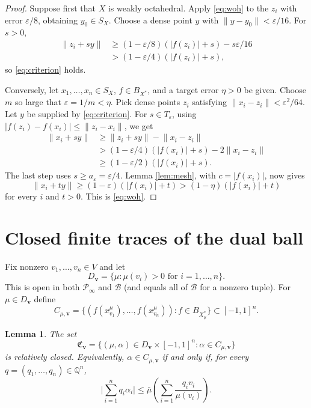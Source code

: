 \documentclass[11pt]{article}
\newtheorem{lemma}[theorem]{Lemma}
\newcommand{\norm}[1]{\lVert#1\rVert}
\newcommand{\abs}[1]{\lvert#1\rvert}
\newcommand{\Bcal}{\mathcal B}
\newcommand{\Pinf}{\mathcal P_\infty}
\begin{document}
\begin{proof}
Suppose first that $X$ is weakly octahedral.  Apply \eqref{eq:woh} to the
$z_i$ with error $\varepsilon/8$, obtaining $y_0\in S_X$.  Choose a dense
point $y$ with $\norm{y-y_0}<\varepsilon/16$.  For $s>0$,
\begin{align*}
 \norm{z_i+s y}
 &\geq (1-\varepsilon/8)(\abs{f(z_i)}+s)
       -s\varepsilon/16\\
 &>(1-\varepsilon/4)(\abs{f(z_i)}+s),
\end{align*}
so \eqref{eq:criterion} holds.

Conversely, let $x_1,\ldots,x_n\in S_X$, $f\in B_{X^*}$, and a target
error $\eta>0$ be given.  Choose $m$ so large that
$\varepsilon=1/m<\eta$.  Pick dense points $z_i$ satisfying
$\norm{x_i-z_i}<\varepsilon^2/64$.  Let $y$ be supplied by
\eqref{eq:criterion}.  For $s\in T_\varepsilon$, using
$\abs{f(z_i)-f(x_i)}\leq\norm{z_i-x_i}$, we get
\begin{align*}
 \norm{x_i+s y}
 &\geq \norm{z_i+s y}-\norm{x_i-z_i}\\
 &>(1-\varepsilon/4)(\abs{f(x_i)}+s)
      -2\norm{x_i-z_i}\\
 &\geq(1-\varepsilon/2)(\abs{f(x_i)}+s).
\end{align*}
The last step uses $s\geq a_\varepsilon=\varepsilon/4$.  Lemma
\ref{lem:mesh}, with $c=\abs{f(x_i)}$, now gives
\[
 \norm{x_i+t y}\geq(1-\varepsilon)(\abs{f(x_i)}+t)
 >(1-\eta)(\abs{f(x_i)}+t)
\]
for every $i$ and $t>0$.  This is \eqref{eq:woh}.
\end{proof}

\section{Closed finite traces of the dual ball}

Fix nonzero $v_1,\ldots,v_n\in V$ and let
\[
 D_{\mathbf v}=\{\mu:\mu(v_i)>0\text{ for }i=1,\ldots,n\}.
\]
This is open in both $\Pinf$ and $\Bcal$ (and equals all of $\Bcal$ for a
nonzero tuple).  For $\mu\in D_{\mathbf v}$ define
\[
 C_{\mu,\mathbf v}
 =\{(f(x_{v_1}^\mu),\ldots,f(x_{v_n}^\mu)):
       f\in B_{X_\mu^*}\}\subset[-1,1]^n.
\]

\begin{lemma}\label{lem:trace}
The set
\[
 \mathfrak C_{\mathbf v}
 =\{(\mu,\alpha)\in D_{\mathbf v}\times[-1,1]^n:
                 \alpha\in C_{\mu,\mathbf v}\}
\]
is relatively closed.  Equivalently, $\alpha\in C_{\mu,\mathbf v}$ if
and only if, for every $q=(q_1,\ldots,q_n)\in\mathbb Q^n$,
\begin{equation}\label{eq:HB}
 \abs{\sum_{i=1}^n q_i\alpha_i}
 \leq
 \bar\mu\!\left(\sum_{i=1}^n
             \frac{q_i v_i}{\mu(v_i)}\right).
\end{equation}
\end{lemma}
\end{document}
